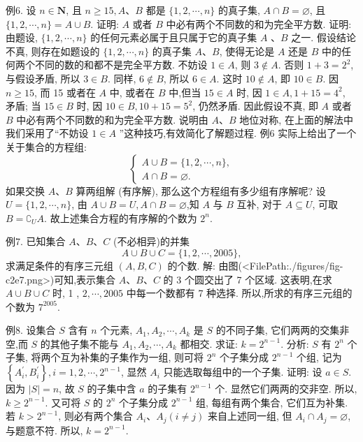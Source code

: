 例6. 设 $n \in \mathbf{N}$, 且 $n \geqslant 15, A 、 B$ 都是 $\{1,2, \cdots, n\}$ 的真子集, $A \cap B=\varnothing$, 且 $\{1,2, \cdots, n\}=A \cup B$. 证明: $A$ 或者 $B$ 中必有两个不同数的和为完全平方数.
证明:由题设, $\{1,2, \cdots, n\}$ 的任何元素必属于且只属于它的真子集 $A$ 、$B$ 之一.
假设结论不真, 则存在如题设的 $\{1,2, \cdots, n\}$ 的真子集 $A 、B$, 使得无论是 $A$ 还是 $B$ 中的任何两个不同的数的和都不是完全平方数.
不妨设 $1 \in A$, 则 $3 \notin A$. 否则 $1+3=2^2$, 与假设矛盾, 所以 $3 \in B$. 同样, $6 \notin B$, 所以 $6 \in A$. 这时 $10 \notin A$, 即 $10 \in B$. 因 $n \geqslant 15$, 而 15 或者在 $A$ 中, 或者在 $B$ 中,但当 $15 \in A$ 时, 因 $1 \in A, 1+15=4^2$, 矛盾; 当 $15 \in B$ 时, 因 $10 \in B, 10+15=5^2$, 仍然矛盾.
因此假设不真, 即 $A$ 或者 $B$ 中必有两个不同数的和为完全平方数.
说明由 $A 、 B$ 地位对称, 在上面的解法中我们采用了“不妨设 $1 \in A$ ”这种技巧,有效简化了解题过程.
例6 实际上给出了一个关于集合的方程组:
$$
\left\{\begin{array}{l}
A \cup B=\{1,2, \cdots, n\}, \\
A \cap B=\varnothing .
\end{array}\right.
$$
如果交换 $A 、 B$ 算两组解 (有序解), 那么这个方程组有多少组有序解呢?
设 $U=\{1,2, \cdots, n\}$, 由 $A \cup B=U, A \cap B=\varnothing$,知 $A$ 与 $B$ 互补, 对于 $A \subseteq U$, 可取 $B=\complement_U A$. 故上述集合方程的有序解的个数为 $2^n$.



例7. 已知集合 $A 、 B 、 C$ (不必相异)的并集
$$
A \cup B \cup C=\{1,2, \cdots, 2005\},
$$
求满足条件的有序三元组 $(A, B, C)$ 的个数.
解: 由图(<FilePath:./figures/fig-c2e7.png>)可知,表示集合 $A 、 B 、 C$ 的 3 个圆交出了 7 个区域.
这表明,在求 $A \cup B \cup C$ 时, 1 , $2, \cdots, 2005$ 中每一个数都有 7 种选择.
所以,所求的有序三元组的个数为 $7^{2005}$.



例8. 设集合 $S$ 含有 $n$ 个元素, $A_1, A_2, \cdots, A_k$ 是 $S$ 的不同子集, 它们两两的交集非空,而 $S$ 的其他子集不能与 $A_1, A_2, \cdots, A_k$ 都相交.
求证: $k=2^{n-1}$.
分析: $S$ 有 $2^n$ 个子集, 将两个互为补集的子集作为一组, 则可将 $2^n$ 个子集分成 $2^{n-1}$ 个组, 记为 $\left\{A_i^{\prime}, B_i^{\prime}\right\}, i=1,2, \cdots, 2^{n-1}$, 显然 $A_i$ 只能选取每组中的一个子集.
证明: 设 $a \in S$. 因为 $|S|=n$, 故 $S$ 的子集中含 $a$ 的子集有 $2^{n-1}$ 个.
显然它们两两的交非空.
所以, $k \geqslant 2^{n-1}$.
又可将 $S$ 的 $2^n$ 个子集分成 $2^{n-1}$ 组, 每组有两个集合, 它们互为补集.
若 $k>2^{n-1}$, 则必有两个集合 $A_i 、 A_j(i \neq j)$ 来自上述同一组, 但 $A_i \cap A_j=\varnothing$,与题意不符.
所以, $k=2^{n-1}$.



